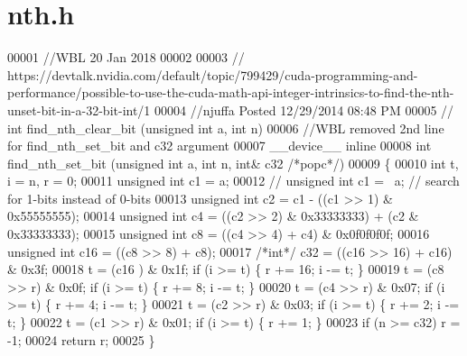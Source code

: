 \hypertarget{nth_8h_source}{}\section{nth.\+h}
\label{nth_8h_source}

\begin{DoxyCode}
00001 \textcolor{comment}{//WBL 20 Jan 2018}
00002 
00003 \textcolor{comment}{//
      https://devtalk.nvidia.com/default/topic/799429/cuda-programming-and-performance/possible-to-use-the-cuda-math-api-integer-intrinsics-to-find-the-nth-unset-bit-in-a-32-bit-int/1}
00004 \textcolor{comment}{//njuffa Posted 12/29/2014 08:48 PM}
00005 \textcolor{comment}{//    int find\_nth\_clear\_bit (unsigned int a, int n)}
00006 \textcolor{comment}{//WBL removed 2nd line for find\_nth\_set\_bit and c32 argument}
00007 \_\_device\_\_ \textcolor{keyword}{inline}
00008 \textcolor{keywordtype}{int} find\_nth\_set\_bit (\textcolor{keywordtype}{unsigned} \textcolor{keywordtype}{int} a, \textcolor{keywordtype}{int} n, \textcolor{keywordtype}{int}& c32 \textcolor{comment}{/*popc*/})
00009     \{
00010         \textcolor{keywordtype}{int} t, i = n, r = 0;
00011         \textcolor{keywordtype}{unsigned} \textcolor{keywordtype}{int} c1 = a;
00012 \textcolor{comment}{//      unsigned int c1 = ~a; // search for 1-bits instead of 0-bits}
00013         \textcolor{keywordtype}{unsigned} \textcolor{keywordtype}{int} c2 = c1 - ((c1 >> 1) & 0x55555555);
00014         \textcolor{keywordtype}{unsigned} \textcolor{keywordtype}{int} c4 = ((c2 >> 2) & 0x33333333) + (c2 & 0x33333333);
00015         \textcolor{keywordtype}{unsigned} \textcolor{keywordtype}{int} c8 = ((c4 >> 4) + c4) & 0x0f0f0f0f;
00016         \textcolor{keywordtype}{unsigned} \textcolor{keywordtype}{int} c16 = ((c8 >> 8) + c8);
00017         \textcolor{comment}{/*int*/} c32 = ((c16 >> 16) + c16) & 0x3f;
00018         t = (c16    ) & 0x1f; \textcolor{keywordflow}{if} (i >= t) \{ r += 16; i -= t; \}
00019         t = (c8 >> r) & 0x0f; \textcolor{keywordflow}{if} (i >= t) \{ r +=  8; i -= t; \}
00020         t = (c4 >> r) & 0x07; \textcolor{keywordflow}{if} (i >= t) \{ r +=  4; i -= t; \}
00021         t = (c2 >> r) & 0x03; \textcolor{keywordflow}{if} (i >= t) \{ r +=  2; i -= t; \}
00022         t = (c1 >> r) & 0x01; \textcolor{keywordflow}{if} (i >= t) \{ r +=  1;         \}
00023         \textcolor{keywordflow}{if} (n >= c32) r = -1;
00024         \textcolor{keywordflow}{return} r; 
00025     \}
\end{DoxyCode}
